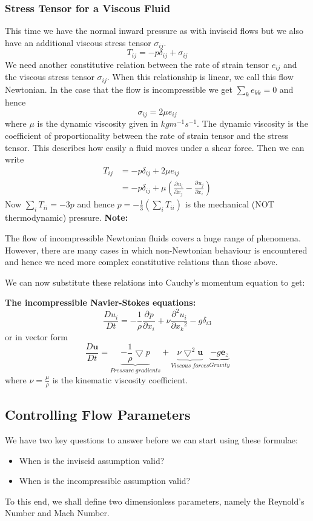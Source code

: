 \documentclass[11pt]{article}
\newcommand*{\pd}[3][]{\ensuremath{\frac{\partial^{#1} {#2}}{\partial {#3}^{#1}}}}
\newcommand*{\md}[1]{\ensuremath{\frac{D #1}{D t}}}
\newcommand{\grad}{\bigtriangledown}
\newcommand{\mv}[1]{\bm{#1}}
\newcommand{\mdf}[1]{{\color{red}#1}}
\newenvironment{note}
    {\textbf{Note:}\begin{mdframed}[backgroundcolor=white, roundcorner=5pt, linewidth=0pt]}
    {\end{mdframed}}
\newenvironment{formula}
	{\begin{mdframed}[backgroundcolor=white, roundcorner=5pt, linewidth=1pt, linecolor=red]}
	{\end{mdframed}}
\begin{document}
\subsubsection{Stress Tensor for a Viscous Fluid}
This time we have the normal inward pressure as with inviscid flows but we also have an additional \mdf{viscous stress tensor} $\sigma_{ij}$.
$$T_{ij}=-p\delta_{ij}+\sigma_{ij}$$
We need another constitutive relation between the rate of strain tensor $e_{ij}$ and the viscous stress tensor $\sigma_{ij}$.
When this relationship is linear, we call this flow \mdf{Newtonian}.
In the case that the flow is incompressible we get $\sum_k e_{kk}=0$ and hence
$$\sigma_{ij}=2\mu e_{ij}$$
where $\mu$ is the dynamic viscosity given in $kgm^{-1}s^{-1}$. The dynamic viscosity is the coefficient of proportionality between the rate of strain tensor and the stress tensor. This describes how easily a fluid moves under a shear force.
Then we can write
\begin{align*}
	T_{ij}&= -p\delta_{ij}+2\mu e_{ij}\\
		  &= -p\delta_{ij}+\mu\left(\pd{u_i}{x_j}-\pd{u_j}{x_i}\right)
\end{align*}
Now $\sum_i T_{ii} = -3p$ and hence $p=-\frac{1}{3}(\sum_i T_{ii})$ is the mechanical (NOT thermodynamic) pressure.
\begin{note}
The flow of incompressible Newtonian fluids covers a huge range of phenomena.
However, there are many cases in which non-Newtonian behaviour is encountered and hence we need more complex constitutive relations than those above.
\end{note}
We can now substitute these relations into Cauchy's momentum equation to get:
\begin{formula}
\textbf{The incompressible Navier-Stokes equations:}
$$\md{u_i}=-\frac{1}{\rho}\pd{p}{x_i}+\nu\pd[2]{u_i}{x_k}-g\delta_{i3}$$
or in vector form
$$\md{\mv{u}}=\underbrace{-\frac{1}{\rho}\grad{p}}_{Pressure\;gradients}+\underbrace{\nu\grad^2\mv{u}}_{Viscous\;forces}\underbrace{-g\mv{e}_z}_{Gravity}$$
where $\nu=\frac{\mu}{\rho}$ is the \mdf{kinematic viscosity coefficient}.
\end{formula}
\subsection{Controlling Flow Parameters}
We have two key questions to answer before we can start using these formulae:
\begin{itemize}
	\item When is the inviscid assumption valid?
	\item When is the incompressible assumption valid?
\end{itemize}
To this end, we shall define two \mdf{dimensionless parameters}, namely the Reynold's Number and Mach Number.
\end{document}
